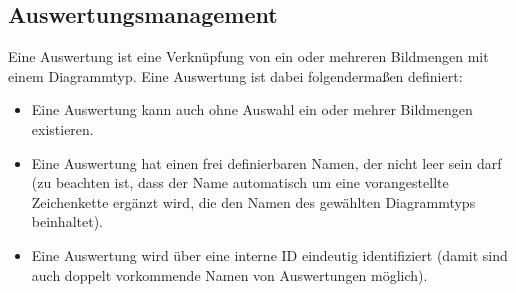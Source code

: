 \subsection{Auswertungsmanagement}
	Eine Auswertung ist eine Verknüpfung von ein oder mehreren Bildmengen mit einem Diagrammtyp. Eine Auswertung ist dabei folgendermaßen definiert:
	\begin{itemize}
		\item Eine Auswertung kann auch ohne Auswahl ein oder mehrer Bildmengen existieren. 
		\item Eine Auswertung hat einen frei definierbaren Namen, der nicht leer sein darf (zu beachten ist, dass der Name automatisch um eine vorangestellte Zeichenkette ergänzt wird, die den Namen des gewählten Diagrammtyps beinhaltet).
		\item Eine Auswertung wird über eine interne ID eindeutig identifiziert (damit sind auch doppelt vorkommende Namen von Auswertungen möglich).
	\end{itemize}
